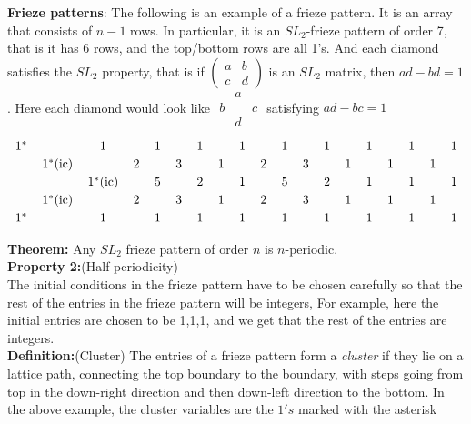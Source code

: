 \documentclass[12pt]{article}
\begin{document}
\textbf{Frieze patterns}:
The following is an example of a frieze pattern. It is an array that consists of $n-1$ rows. In particular, it is an $SL_2$-frieze pattern of order 7, that is it has 6 rows, and the top/bottom rows are all 1's. And each diamond satisfies the $SL_2$ property, that is if $\begin{pmatrix} a & b\\ c& d \end{pmatrix}$
is an $SL_2$ matrix, then $ad-bd=1$. Here each diamond would look like
$
\begin{array}{ccc}
     &a&  \\
     b&&c\\
     &d&
\end{array}
$ satisfying $ad-bc=1$
\[
\renewcommand{\arraystretch}{1.2}
\setlength{\arraycolsep}{6pt}
\begin{array}{cccccccccccccccccccc}
1^* &   & 1 &   & 1 &   & 1 &   & 1 &   & 1 &   & 1 &   & 1 &  &1&    &1\\
  & 1^*(\mathrm{ic}) &   & 2 &   & 3 &   & 1 &   & 2 &   & 3 &   & 1 &   & 1&   &1\\
 &   &  1^*(\mathrm{ic}) &   & 5 &   & 2 &   & 1 &   & 5 &   & 2 &   & 1 &     &1&  &1\\
  & 1^*(\mathrm{ic}) &   & 2 &   & 3 &   & 1 &   & 2 &   & 3 &   & 1 &   & 1&   &1\\
1^* &   & 1 &   & 1 &   & 1 &   & 1 &   & 1 &   & 1 &   & 1 &     &1&  &1\\
\end{array}
\]

\textbf{Theorem: } Any $SL_2$ frieze pattern of order $n$ is $n$-periodic.\\

\textbf{Property 2:}(Half-periodicity)\\

The initial conditions in the frieze pattern have to be chosen carefully so that the rest of the entries in the frieze pattern will be integers, For example, here the initial entries are chosen to be 1,1,1, and we get that the rest of the entries are integers.\\

\textbf{Definition:}(Cluster)  The entries of a frieze pattern form a \textit{cluster} if they lie on a lattice path, connecting the top boundary to the boundary, with steps going from top in the down-right direction and then down-left direction to the bottom. In the above example, the cluster variables are the $1's$ marked with the asterisk
\end{document}
